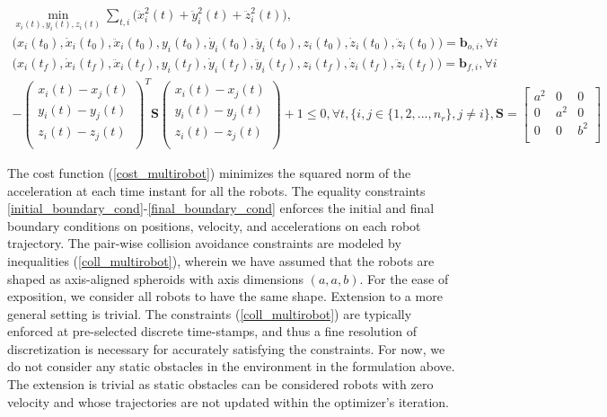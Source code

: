 \begin{subequations}
\begin{align}
\min_{x_{i}(t), y_{i}(t), z_{i}(t)} \sum_{t, i} \Big(\ddot{x}_{i}^2(t)+\ddot{y}_{i}^2(t)+\ddot{z}_{i}^2(t)\Big),\label{cost_multirobot} \\
\Big(x_i(t_0), \dot{x}_i(t_0), \ddot{x}_i(t_0), y_i(t_0), \dot{y}_i(t_0), \ddot{y}_i(t_0), z_i(t_0), \dot{z}_i(t_0), \ddot{z}_i(t_0)) = \textbf{b}_{o, i}, \forall i \label{initial_boundary_cond} \\
\Big(x_i(t_f), \dot{x}_i(t_f), \ddot{x}_i(t_f), y_i(t_f), \dot{y}_i(t_f), \ddot{y}_i(t_f), z_i(t_f), \dot{z}_i(t_f), \ddot{z}_i(t_f)) = \textbf{b}_{f, i}, \forall i \label{final_boundary_cond} \\
  -\left(\begin{matrix}
 x_i(t)-x_j(t)\\
 y_i(t)-y_j(t)\\
 z_i(t)-z_j(t)\\
 \end{matrix}\right)^T\textbf{S}\left(\begin{matrix}
 x_i(t)-x_j(t)\\
 y_i(t)-y_j(t)\\
 z_i(t)-z_j(t)\\
 \end{matrix}\right)+1 \leq 0, \forall t,  \{i,j \in \{1,2,...,n_{r}\}, j \neq  i\} \label{coll_multirobot}, \textbf{S} = \begin{bmatrix}
 a^2 & 0 & 0 \\
 0 & a^2 & 0 \\
 0 & 0 & b^2 \\
 \end{bmatrix}
 \end{align}
\end{subequations}

\noindent The cost function (\ref{cost_multirobot}) minimizes the squared norm of the acceleration at each time instant for all the robots. The equality constraints  \eqref{initial_boundary_cond}-\eqref{final_boundary_cond} enforces the initial and final boundary conditions on positions, velocity, and accelerations on each robot trajectory. The pair-wise collision avoidance constraints are modeled by inequalities (\ref{coll_multirobot}), wherein we have assumed that the robots are shaped as axis-aligned spheroids with axis dimensions $(a, a, b)$. For the ease of exposition, we consider all robots to have the same shape. Extension to a more general setting is trivial. The constraints  (\ref{coll_multirobot})  are typically enforced at pre-selected discrete time-stamps, and thus a fine resolution of discretization is necessary for accurately satisfying the constraints. For now, we do not consider any static obstacles in the environment in the formulation above. The extension is trivial as static obstacles can be considered robots with zero velocity and whose trajectories are not updated within the optimizer's iteration.

